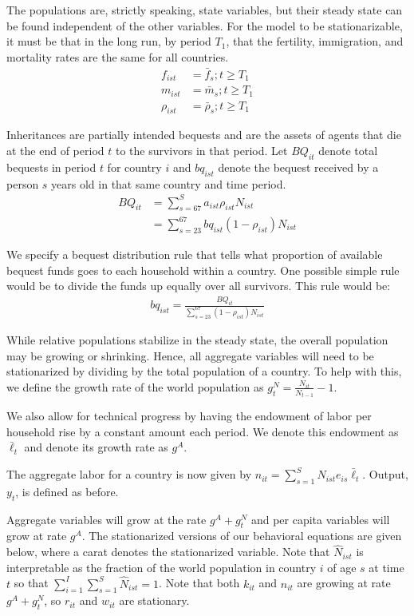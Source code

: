 \documentclass[letterpaper,12pt]{article}
\theoremstyle{definition}
\numberwithin{equation}{section}
\begin{document}
\begin{spacing}{1.5}
	The populations are, strictly speaking, state variables, but their steady state can be found independent of the other variables.  For the model to be stationarizable, it must be that in the long run, by period $T_1$, that the fertility, immigration, and mortality rates are the same for all countries.
	\begin{align}
		f_{ist} & = \bar f_s; t \ge T_1 \\
		m_{ist} & = \bar m_s; t \ge T_1 \\
		\rho_{ist} & = \bar \rho_s; t \ge T_1
	\end{align}

	Inheritances are partially intended bequests and are the assets of agents that die at the end of period $t$ to the survivors in that period.  Let $BQ_{it}$ denote total bequests in period $t$ for country $i$ and $bq_{ist}$ denote the bequest received by a person $s$ years old in that same country and time period.
	\begin{align}
		BQ_{it} & = \sum_{s=67}^S a_{ist} \rho_{ist} N_{ist} \\
		& = \sum_{s=23}^{67} bq_{ist} (1-\rho_{ist}) N_{ist}
	\end{align}

	We specify a bequest distribution rule that tells what proportion of available bequest funds goes to each household within a country.  One possible simple rule would be to divide the funds up equally over all survivors.  This rule would be:
	\begin{align}
		bq_{ist} = \frac{BQ_{it}}{\sum_{s=23}^{67} (1-\rho_{ist}) N_{ist}} \nonumber
	\end{align}

	While relative populations stabilize in the steady state, the overall population may be growing or shrinking.  Hence, all aggregate variables will need to be stationarized by dividing by the total population of a country.  To help with this, we define the growth rate of the world population as $g^N_t = \tfrac{N_{it}}{N_{t-1}}-1$.

	We also allow for technical progress by having the endowment of labor per household rise by a constant amount each period.  We denote this endowment as $\bar \ell_t$ and denote its growth rate as $g^A$.

	The aggregate labor for a country is now given by $n_{it} = \sum_{s=1}^S N_{ist} e_{is} \bar \ell_t$.  Output, $y_t$, is defined as before. 

	Aggregate variables will grow at the rate $g^A+g^N_t$ and per capita variables will grow at rate $g^A$.  The stationarized versions of our behavioral equations are given below, where a carat denotes the stationarized variable.  Note that $\hat N_{ist}$ is interpretable as the fraction of the world population in country $i$ of age $s$ at time $t$ so that $\sum_{i=1}^I \sum_{s=1}^S \hat N_{ist} = 1$.  Note that both $k_{it}$ and $n_{it}$ are growing at rate $g^A+g^N_t$, so $r_{it}$ and $w_{it}$ are stationary.


\end{spacing}
\end{document}
